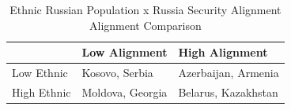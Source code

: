 \begin{table}[!t]
\caption*{
{\large Ethnic Russian Population x Russia Security Alignment} \\ 
{\small Alignment Comparison}
} 
\fontsize{12.0pt}{14.4pt}\selectfont
\begin{tabular*}{\linewidth}{@{\extracolsep{\fill}}lll}
\toprule
 & Low Alignment & High Alignment \\ 
\midrule\addlinespace[2.5pt]
Low Ethnic & {Kosovo, Serbia} & {Azerbaijan, Armenia} \\ 
High Ethnic & {Moldova, Georgia} & {Belarus, Kazakhstan} \\ 
\bottomrule
\end{tabular*}
\end{table}

